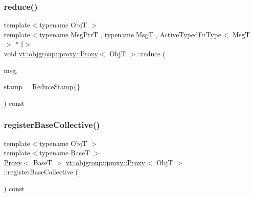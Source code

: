 \mbox{\label{structvt_1_1objgroup_1_1proxy_1_1_proxy_a491518842d05bb84d4b190765a02530f}} 
\subsubsection{\texorpdfstring{reduce()}{reduce()}\hspace{0.1cm}{\footnotesize\ttfamily [3/3]}}
{\footnotesize\ttfamily template$<$typename ObjT $>$ \\
template$<$typename Msg\+PtrT , typename MsgT , Active\+Typed\+Fn\+Type$<$ Msg\+T $>$ $\ast$ f$>$ \\
void \hyperlink{structvt_1_1objgroup_1_1proxy_1_1_proxy}{vt\+::objgroup\+::proxy\+::\+Proxy}$<$ ObjT $>$\+::reduce (\begin{DoxyParamCaption}\item[{Msg\+PtrT}]{msg,  }\item[{\hyperlink{structvt_1_1objgroup_1_1proxy_1_1_proxy_a337be4c20cf11ff6477c7a66208cc909}{Reduce\+Stamp}}]{stamp = {\ttfamily \hyperlink{structvt_1_1objgroup_1_1proxy_1_1_proxy_a337be4c20cf11ff6477c7a66208cc909}{Reduce\+Stamp}\{\}} }\end{DoxyParamCaption}) const}

\mbox{\label{structvt_1_1objgroup_1_1proxy_1_1_proxy_a3504fe25af8c839995a98d445af37282}} 
\subsubsection{\texorpdfstring{register\+Base\+Collective()}{registerBaseCollective()}}
{\footnotesize\ttfamily template$<$typename ObjT $>$ \\
template$<$typename BaseT $>$ \\
\hyperlink{structvt_1_1objgroup_1_1proxy_1_1_proxy}{Proxy}$<$ BaseT $>$ \hyperlink{structvt_1_1objgroup_1_1proxy_1_1_proxy}{vt\+::objgroup\+::proxy\+::\+Proxy}$<$ ObjT $>$\+::register\+Base\+Collective (\begin{DoxyParamCaption}{ }\end{DoxyParamCaption}) const}

